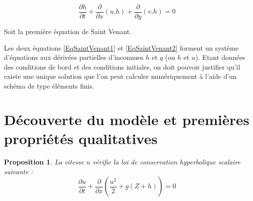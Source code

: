 \documentclass[
11pt, %
francais, %
singlespacing, %
headsepline, %
]{MastersDoctoralThesis} %
\newtheorem{prop}{Proposition}
\begin{document}
\begin{equation}
\frac{\partial h}{\partial t} + \frac{\partial}{\partial x} (u . h ) + \frac{\partial}{\partial y} (v . h )=0 \label{EqSaintVenant1}
\end{equation}

Soit la première équation de Saint Venant.

\bigskip

Les deux équations \ref{EqSaintVenant1} et \ref{EqSaintVenant2} forment un système d'équations aux dérivées partielles d'inconnues $h$ et $q$ (ou $h$ et $u$). Etant données des conditions de bord et des conditions initiales, on doit pouvoir justifier qu'il existe une unique solution que l'on peut calculer numériquement à l'aide d'un schéma de type éléments finis.

\section{Découverte du modèle et premières propriétés qualitatives}

\begin{prop} La vitesse $u$ vérifie la loi de conservation hyperbolique scalaire suivante : 
\begin{equation}
\frac{\partial u}{\partial t}+\frac{\partial}{\partial x}(\frac{u^{2}}{2}+g(Z+h))=0 \label{cl}
\end{equation}

\end{prop}
\end{document}

